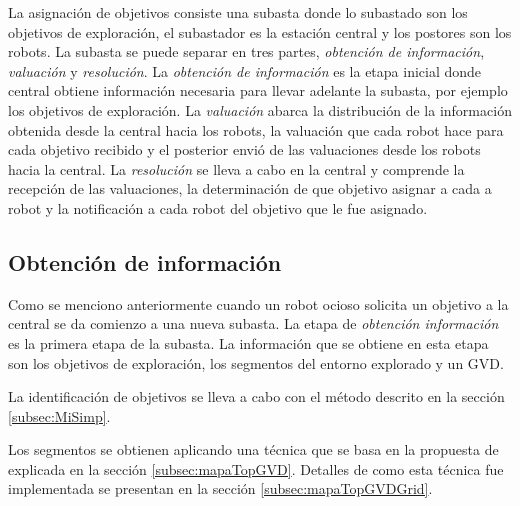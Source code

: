 La asignación de objetivos consiste una subasta donde lo subastado son los
objetivos de exploración, el subastador es la estación central y los postores
son los robots. La subasta se puede separar en tres partes, \emph{obtención de
  información}, \emph{valuación} y \emph{resolución}. La \emph{obtención de
información} es la etapa inicial donde central obtiene información necesaria
para llevar adelante la subasta, por ejemplo los objetivos de exploración. La
\emph{valuación} abarca la distribución de la información obtenida desde la
central hacia los robots, la valuación que cada robot hace para cada objetivo
recibido y el posterior envió de las valuaciones desde los robots hacia la
central. La \emph{resolución} se lleva a cabo en la central y comprende la
recepción de las valuaciones, la determinación de que objetivo asignar a cada a
robot y la notificación a cada robot del objetivo que le fue asignado.



\subsection{Obtención de información}\label{subsec:obtInfo}
Como se menciono anteriormente cuando un robot ocioso solicita un objetivo a la
central se da comienzo a una nueva subasta. La etapa de \emph{obtención
información} es la primera etapa de la subasta. La información que se obtiene
en esta etapa son los objetivos de exploración, los segmentos del entorno
explorado y un GVD.

La identificación de objetivos se lleva a cabo con el método descrito en la
sección \ref{subsec:MiSimp}.

Los segmentos se obtienen aplicando una técnica que se basa en la propuesta de
\cite{Thrun1998} explicada en la sección \ref{subsec:mapaTopGVD}. Detalles de
como esta técnica fue implementada se presentan en la sección
\ref{subsec:mapaTopGVDGrid}. 

